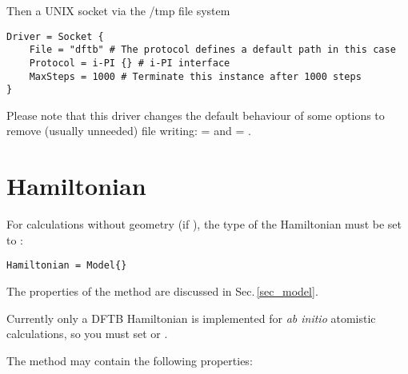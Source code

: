 Then a UNIX socket via the /tmp file system
\begin{verbatim}
Driver = Socket {
    File = "dftb" # The protocol defines a default path in this case
    Protocol = i-PI {} # i-PI interface
    MaxSteps = 1000 # Terminate this instance after 1000 steps
}
\end{verbatim}

Please note that this driver changes the default behaviour of some options to
remove (usually unneeded) file writing:  =  and
 = .


\newpage
\section{Hamiltonian}
\label{sec:dftbp.Hamiltonian}

{\new

For calculations without geometry \big(if \big), the type of the Hamiltonian must be set to :
\begin{verbatim}
Hamiltonian = Model{}
\end{verbatim}

The properties of the  method are discussed in Sec.\,\ref{sec_model}.
}

Currently only a DFTB Hamiltonian is implemented for {\it ab initio} atomistic calculations, so you must set
 or .

The  method may contain the
following properties:

